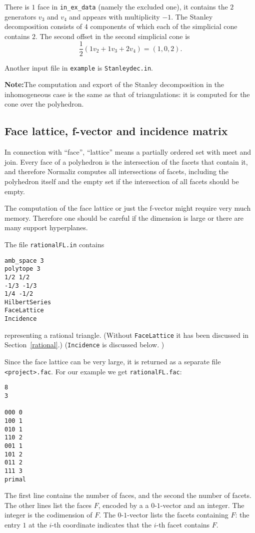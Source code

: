 \documentclass[12pt,a4paper]{scrartcl}
\theoremstyle{definition}
\begin{document}
There is $1$ face in \verb|in_ex_data| (namely the excluded one), it contains the $2$ generators $v_3$ and $v_4$ and appears with multiplicity $-1$. The Stanley decomposition consists of $4$ components of which each of the simplicial cone contains $2$. The second offset in the second simplicial cone is
$$
\frac12 (1v_2+1v_3+2v_4)=(1,0,2).
$$

Another input file in \verb|example| is \verb|Stanleydec.in|.

\textbf{Note:}\enspace The computation and export of the Stanley decomposition in the inhomogeneous case is the same as that of triangulations: it is computed for the cone over the polyhedron.

\subsection{Face lattice, f-vector and incidence matrix}\label{FaceLattice}

In connection with ``face'', ``lattice'' means a partially ordered set with meet and join. Every face of a polyhedron is the intersection of the facets that contain it, and therefore Normaliz computes all intersections of facets, including the polyhedron itself and the empty set if the intersection of all facets should be empty.

The computation of the face lattice or just the f-vector might require very much memory. Therefore one should be careful if the dimension is large or there are many support hyperplanes.

The file \verb|rationalFL.in| contains
\begin{Verbatim}
amb_space 3
polytope 3
1/2 1/2
-1/3 -1/3
1/4 -1/2
HilbertSeries
FaceLattice
Incidence
\end{Verbatim}
representing a rational triangle. (Without \verb|FaceLattice| it has been discussed in Section~\ref{rational}.) (\verb|Incidence| is discussed below.
)

Since the face lattice can be very large, it is returned as a separate file \verb|<project>.fac|. For our example we get \verb|rationalFL.fac|:
\begin{Verbatim}
8
3

000 0
100 1
010 1
110 2
001 1
101 2
011 2
111 3
primal
\end{Verbatim}
The first line contains the number of faces, and the second the number of facets. The other lines list the faces $F$, encoded by a a $0$-$1$-vector and an integer. The integer is the codimension of $F$. The $0$-$1$-vector lists the facets containing $F$: the entry $1$ at the $i$-th coordinate indicates that the $i$-th facet contains $F$.
\end{document}
